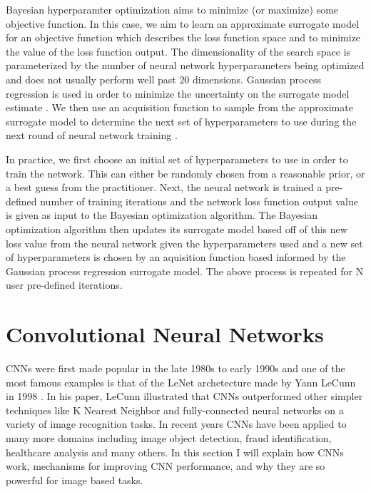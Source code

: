 Bayesian hyperparamter optimization aims to minimize (or maximize) some 
objective function. In this case, we aim to learn an 
approximate surrogate model for an objective function which 
describes the loss function space and to minimize the value of the 
loss function output. The dimensionality of the search space 
is parameterized by the number of neural network hyperparameters being optimized 
and does not usually perform well past 20 dimensions. Gaussian process 
regression is used in order to minimize the uncertainty on the surrogate model estimate 
. We then use an acquisition function to sample from the approximate 
surrogate model to determine the next set of hyperparameters to use 
during the next round of neural network training \cite{1807.02811}.

In practice, we first choose an initial set of hyperparameters 
to use in order to train the network. This can either be randomly chosen 
from a reasonable prior, or a best guess from the practitioner. 
Next, the neural network is trained a pre-defined number of 
training iterations and the network loss function output value 
is given as input to the Bayesian optimization algorithm. The Bayesian 
optimization algorithm then updates its surrogate model 
based off of this new loss value from the neural network 
given the hyperparameters used and a new set of 
hyperparameters is chosen by an aquisition function based 
informed by the Gaussian process regression surrogate model. 
The above process is repeated for N user pre-defined iterations.
%

\section{Convolutional Neural Networks}

\ac{CNN}s were first made popular in the late 1980s to early 1990s 
and one of the most famous examples is that of the LeNet archetecture 
made by Yann LeCunn in 1998 \cite{726791}. In his paper, LeCunn 
illustrated that \ac{CNN}s outperformed other simpler 
techniques like K Nearest Neighbor and fully-connected 
neural networks on a variety of image recognition 
tasks. In recent years \ac{CNN}s have been applied to 
many more domains including image object detection, 
fraud identification, healthcare analysis and many 
others. In this section I will explain how \ac{CNN}s work, 
mechanisms for improving \ac{CNN} performance, and 
why they are so powerful for image based tasks.

